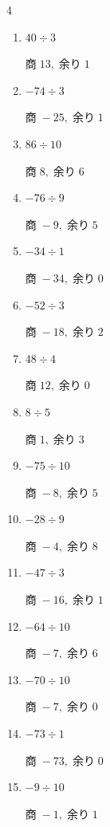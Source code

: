 \begin{multicols}{4}
\begin{enumerate}
  \item $40 \div 3$

        $商\; 13,\; 余り\; 1$

  \item $-74 \div 3$

        $商\; -25,\; 余り\; 1$

  \item $86 \div 10$

        $商\; 8,\; 余り\; 6$

  \item $-76 \div 9$

        $商\; -9,\; 余り\; 5$

  \item $-34 \div 1$

        $商\; -34,\; 余り\; 0$

  \item $-52 \div 3$

        $商\; -18,\; 余り\; 2$

  \item $48 \div 4$

        $商\; 12,\; 余り\; 0$

  \item $8 \div 5$

        $商\; 1,\; 余り\; 3$

  \item $-75 \div 10$

        $商\; -8,\; 余り\; 5$

  \item $-28 \div 9$

        $商\; -4,\; 余り\; 8$

\columnbreak %

  \item $-47 \div 3$

        $商\; -16,\; 余り\; 1$

  \item $-64 \div 10$

        $商\; -7,\; 余り\; 6$

  \item $-70 \div 10$

        $商\; -7,\; 余り\; 0$

  \item $-73 \div 1$

        $商\; -73,\; 余り\; 0$

  \item $-9 \div 10$

        $商\; -1,\; 余り\; 1$


\end{enumerate}
\end{multicols}
